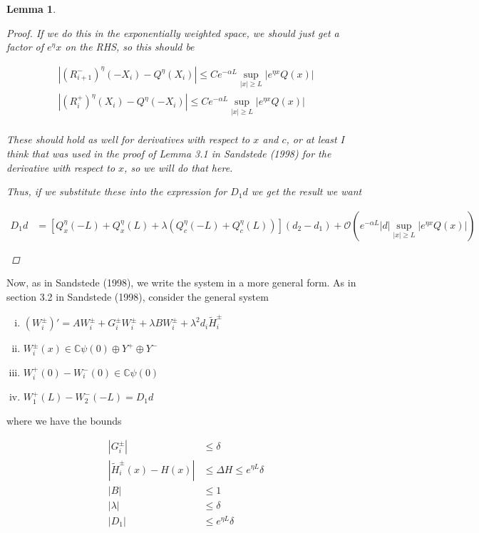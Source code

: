 \documentclass[12pt]{article}
\def\C{{\mathbb C}}
\newtheorem{lemma}{Lemma}
\begin{document}
\begin{lemma}
\begin{proof}
If we do this in the exponentially weighted space, we should just get a factor of $e^\eta x$ on the RHS, so this should be

\begin{align*}
|(R_{i+1}^-)^\eta(-X_i) - Q^\eta(X_i)| \leq C e^{-\alpha L} \sup_{|x| \geq L} |e^{\eta x} Q(x)| \\
|(R_{i}^+)^\eta(X_i) - Q^\eta(-X_i)| \leq C e^{-\alpha L} \sup_{|x| \geq L} |e^{\eta x} Q(x)| \\
\end{align*}

These should hold as well for derivatives with respect to $x$ and $c$, or at least I think that was used in the proof of Lemma 3.1 in Sandstede (1998) for the derivative with respect to $x$, so we will do that here. 

Thus, if we substitute these into the expression for $D_1 d$ we get the result we want

\begin{align*}
D_1 d &= [Q^\eta_x(-L) + Q^\eta_x(L) + 
\lambda(Q^\eta_c(-L) + Q^\eta_c(L))](d_2 - d_1) + \mathcal{O}\left(e^{-\alpha L} |d| \sup_{|x| \geq L} |e^{\eta x} Q(x)| \right) \\ \\
\end{align*}

\end{proof}
\end{lemma}

Now, as in Sandstede (1998), we write the system in a more general form. As in section 3.2 in Sandstede (1998), consider the general system

\begin{enumerate}[(i)]
\item $(W_i^\pm)' = A W_i^\pm + G_i^\pm W_i^\pm + \lambda B W_i^\pm + \lambda^2 d_i \tilde{H}_i^\pm$
\item $W_i^\pm(x) \in \C \psi(0) \oplus Y^+ \oplus Y^-$
\item $W_i^+(0) - W_i^-(0) \in \C \psi(0) $
\item $W_1^+(L) - W_2^-(-L) = D_1 d $
\end{enumerate}

where we have the bounds 

\begin{align*}
|G_i^\pm| & \leq \delta \\
|\tilde{H}_i^\pm(x) - H(x)| &\leq \Delta H \leq e^{\eta L} \delta\\
|B| &\leq 1 \\
|\lambda| &\leq \delta \\
|D_1| &\leq e^{\eta L} \delta
\end{align*}
\end{document}
